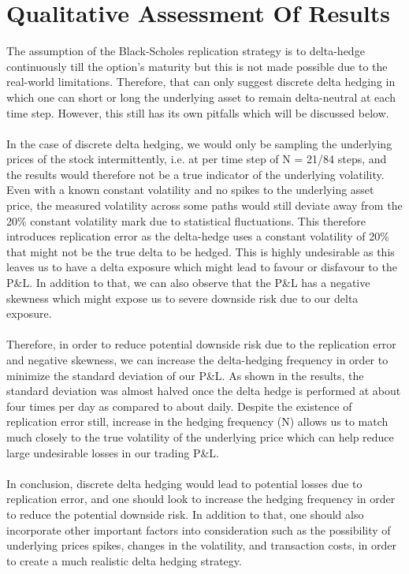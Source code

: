 \documentclass{article}
\begin{document}
\section{Qualitative Assessment Of Results}

\noindent The assumption of the Black-Scholes replication strategy is to delta-hedge continuously till the option’s maturity but this is not made possible due to the real-world limitations. Therefore, that can only suggest discrete delta hedging in which one can short or long the underlying asset to remain delta-neutral at each time step. However, this still has its own pitfalls which will be discussed below. \\ \\

\noindent In the case of discrete delta hedging, we would only be sampling the underlying prices of the stock intermittently, i.e. at per time step of N = 21/84 steps, and the results would therefore not be a true indicator of the underlying volatility. Even with a known constant volatility and no spikes to the underlying asset price, the measured volatility across some paths would still deviate away from the 20\% constant volatility mark due to statistical fluctuations.  This therefore introduces replication error as the delta-hedge uses a constant volatility of 20\% that might not be the true delta to be hedged. This is highly undesirable as this leaves us to have a delta exposure which might lead to favour or disfavour to the P\&L.  In addition to that, we can also observe that the P\&L has a negative skewness which might expose us to severe downside risk due to our delta exposure. \\ \\

\noindent Therefore, in order to reduce potential downside risk due to the replication error and negative skewness, we can increase the delta-hedging frequency in order to minimize the standard deviation of our P\&L. As shown in the results, the standard deviation was almost halved once the delta hedge is performed at about four times per day as compared to about daily. Despite the existence of replication error still, increase in the hedging frequency (N) allows us to match much closely to the true volatility of the underlying price which can help reduce large undesirable losses in our trading P\&L. \\ \\

\noindent In conclusion, discrete delta hedging would lead to potential losses due to replication error, and one should look to increase the hedging frequency in order to reduce the potential downside risk. In addition to that, one should also incorporate other important factors into consideration such as the possibility of underlying prices spikes, changes in the volatility, and transaction costs, in order to create a much realistic delta hedging strategy. 
\end{document}
